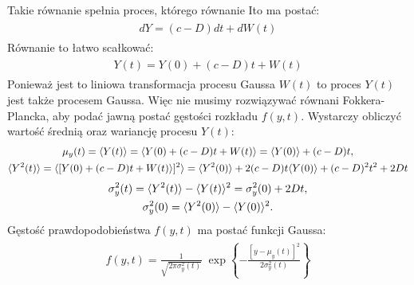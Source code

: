 \documentclass[a4paper,12pt,polish]{sphinxmanual}
\begin{document}
Takie równanie spełnia proces, którego równanie Ito ma postać:
\label{ch3/chIII033:equation-eqn19}\begin{gather}
\begin{split}dY = (c - D) dt + dW(t)\end{split}\label{ch3/chIII033-eqn19}
\end{gather}
Równanie to łatwo scałkować:
\label{ch3/chIII033:equation-eqn20}\begin{gather}
\begin{split}Y(t) = Y(0) + (c - D) t + W(t)\end{split}\label{ch3/chIII033-eqn20}
\end{gather}
Ponieważ jest to liniowa transformacja procesu Gaussa $W(t)$ to proces $Y(t)$ jest także procesem Gaussa. Więc nie musimy rozwiązywać równani Fokkera-Plancka, aby podać jawną postać gęstości rozkładu $f(y, t)$. Wystarczy obliczyć wartość średnią oraz wariancję procesu $Y(t)$:
\label{ch3/chIII033:equation-eqn21}\begin{gather}
\begin{split}\mu_y(t)=\langle Y(t)\rangle=\langle Y(0) + (c - D) t + W(t)\rangle=\langle Y(0)\rangle + (c-D) t,\end{split}\label{ch3/chIII033-eqn21}\\\begin{split}\langle Y^2(t)\rangle=\langle [Y(0) + (c - D) t + W(t)\rangle]^2 \rangle =\langle Y^2(0)\rangle + 2 (c-D) t \langle Y(0)\rangle + (c-D)^2 t^2 + 2Dt\end{split}\notag
\end{gather}\label{ch3/chIII033:equation-eqn22}\begin{gather}
\begin{split}\sigma_y^2(t) = \langle Y^2(t)\rangle - \langle Y(t)\rangle^2 = \sigma_y^2(0) + 2Dt,\end{split}\label{ch3/chIII033-eqn22}\\\begin{split}\sigma_y^2(0) = \langle Y^2(0)\rangle - \langle Y(0)\rangle^2 .\end{split}\notag
\end{gather}
Gęstość prawdopodobieństwa $f(y, t)$ ma postać funkcji Gaussa:
\label{ch3/chIII033:equation-eqn23}\begin{gather}
\begin{split}f(y, t) = \frac{1}{\sqrt{2\pi \sigma_y^2(t)} }\; \exp\left\{ - \frac{[y-\mu_y(t)]^2}{2\sigma_y^2(t)}\right\}\end{split}\label{ch3/chIII033-eqn23}
\end{gather}
\end{document}
